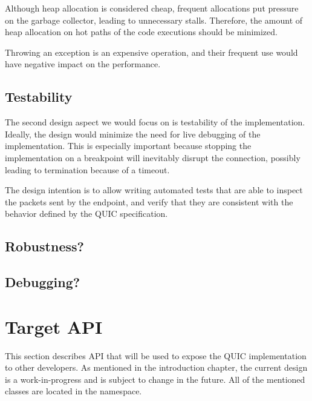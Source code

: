 \begin{itemize}

     Although heap allocation is considered cheap, frequent
    allocations put pressure on the \dotnet{} garbage collector, leading to unnecessary stalls.
    Therefore, the amount of heap allocation on hot paths of the code executions should be
    minimized.

     Throwing an exception is an expensive operation, and
    their frequent use would have negative impact on the performance.

\end{itemize}

\subsection{Testability}

The second design aspect we would focus on is testability of the implementation. Ideally, the design
would minimize the need for live debugging of the implementation. This is especially important
because stopping the implementation on a breakpoint will inevitably disrupt the connection, possibly
leading to termination because of a timeout.

The design intention is to allow writing automated tests that are able to inspect the packets sent
by the endpoint, and verify that they are consistent with the behavior defined by the QUIC
specification.

\subsection{Robustness?}


\subsection{Debugging?}


\section{Target \dotnet{} API}

This section describes API that will be used to expose the QUIC implementation to other developers.
As mentioned in the introduction chapter, the current design is a work-in-progress and is subject to
change in the future. All of the mentioned classes are located in the 
namespace.

